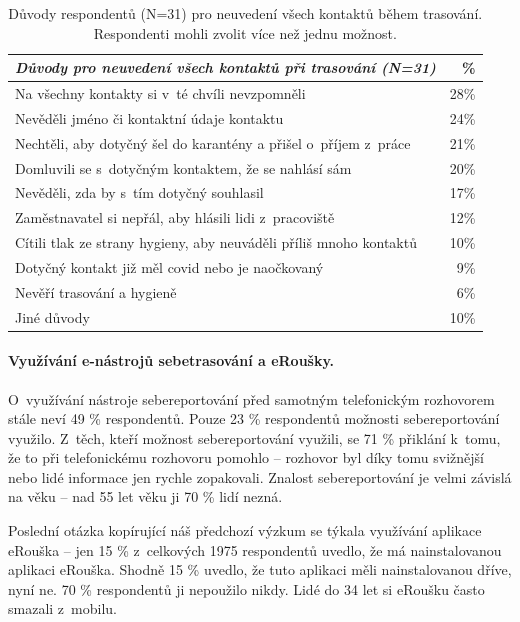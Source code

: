 \begin{table}
\begin{center}
\begin{tabular}{|l|r|}
\hline
\emph{Důvody pro neuvedení všech kontaktů při trasování (N=31)} &  \% \\
\hline \hline
Na všechny kontakty si v~té chvíli nevzpomněli & 28\% \\
Nevěděli jméno či kontaktní údaje kontaktu & 24\% \\
Nechtěli, aby dotyčný šel do karantény a přišel o~příjem z~práce & 21\% \\
Domluvili se s~dotyčným kontaktem, že se nahlásí sám & 20\% \\
Nevěděli, zda by s~tím dotyčný souhlasil & 17\% \\
Zaměstnavatel si nepřál, aby hlásili lidi z~pracoviště & 12\% \\
Cítili tlak ze strany hygieny, aby neuváděli příliš mnoho kontaktů & 10\% \\
Dotyčný kontakt již měl covid nebo je naočkovaný & 9\% \\
Nevěří trasování a hygieně & 6\% \\
Jiné důvody & 10\% \\
\hline
\end{tabular}
\end{center}
\caption{Důvody respondentů (N=31) pro neuvedení všech kontaktů během trasování. Respondenti mohli zvolit více než jednu možnost.}
\end{table}

\paragraph*{Využívání e-nástrojů sebetrasování a eRoušky.}
O~využívání nástroje sebereportování před samotným telefonickým rozhovorem stále neví 49 \% respondentů. Pouze 23 \% respondentů možnosti sebereportování využilo. Z~těch, kteří možnost sebereportování využili, se 71 \% přiklání k~tomu, že to při telefonickému rozhovoru pomohlo -- rozhovor byl díky tomu svižnější nebo lidé informace jen rychle zopakovali. Znalost sebereportování je velmi závislá na věku -- nad 55 let věku ji 70 \% lidí nezná. 

Poslední otázka kopírující náš předchozí výzkum se týkala využívání aplikace eRouška -- jen 15 \% z~celkových 1975 respondentů uvedlo, že má nainstalovanou aplikaci eRouška. Shodně 15 \% uvedlo, že tuto aplikaci měli nainstalovanou dříve, nyní ne. 70 \% respondentů ji nepoužilo nikdy. Lidé do 34 let si eRoušku často smazali z~mobilu. 

